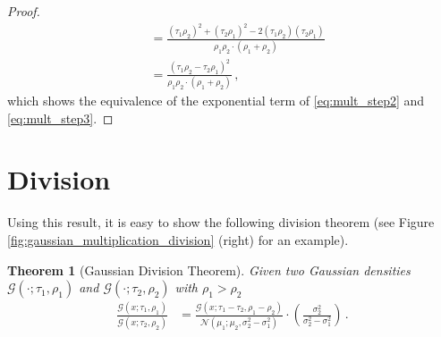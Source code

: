 \documentclass[a4paper]{article}
\newcommand{\Normal}[3]{{\mathcal N} \left({#1};{#2},{#3}\right)}
\newcommand{\Gauss}[3]{{\mathcal G} \left({#1};{#2},{#3}\right)}
\newtheorem{theorem}{Theorem}
\theoremstyle{definition}
\begin{document}
\begin{proof}
\begin{align*}
        & = \frac{\left( \tau_1\rho_2 \right)^2 + \left( \tau_2\rho_1 \right)^2 - 2\left( \tau_1\rho_2 \right) \left( \tau_2\rho_1 \right)}{\rho_1\rho_2 \cdot \left(\rho_1 + \rho_2\right)}                                \\
        & = \frac{\left( \tau_1\rho_2 - \tau_2\rho_1 \right)^2}{\rho_1\rho_2 \cdot \left(\rho_1 + \rho_2\right)} \,,
    \end{align*}
    which shows the equivalence of the exponential term of \eqref{eq:mult_step2} and \eqref{eq:mult_step3}.
\end{proof}


\section*{Division}
Using this result, it is easy to show the following division theorem (see Figure \ref{fig:gaussian_multiplication_division} (right) for an example).
\begin{theorem}[Gaussian Division Theorem] \label{thm:gaussian_division}
    Given two Gaussian densities $\Gauss{\cdot}{\tau_1}{\rho_1}$ and $\Gauss{\cdot}{\tau_2}{\rho_2}$ with $\rho_1 > \rho_2$
    \begin{align}
        \frac{\Gauss{x}{\tau_1}{\rho_1}}{\Gauss{x}{\tau_2}{\rho_2}} & = \frac{\Gauss{x}{\tau_1 - \tau_2}{\rho_1 - \rho_2}}{\Normal{\mu_1}{\mu_2}{\sigma_2^2 - \sigma_1^2}} \cdot \left( \frac{\sigma_2^2}{\sigma_2^2 - \sigma_1^2} \right) \,.
    \end{align}
\end{theorem}
\end{document}
